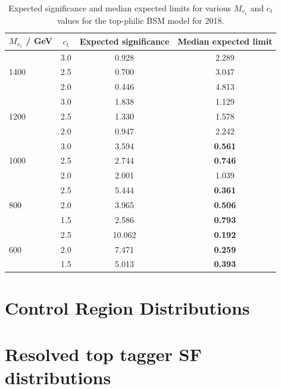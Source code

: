 \documentclass[twoside]{article}
\begin{document}
\begin{table}[h!]
    \centering
    \begin{tabular}{l c c c}
        \toprule
        \textbf{$M_{v_{1}}$ / GeV} & \textbf{$c_t$} & \textbf{Expected significance} & \textbf{Median expected limit} \\
        \midrule
        \multirow{3}{*}{1400} & 3.0 & 0.928 & 2.289 \\
                              & 2.5 & 0.700 & 3.047 \\
                              & 2.0 & 0.446 & 4.813 \\
        \midrule
        \multirow{3}{*}{1200} & 3.0 & 1.838 & 1.129 \\
                              & 2.5 & 1.330 & 1.578 \\
                              & 2.0 & 0.947 & 2.242 \\
        \midrule
        \multirow{3}{*}{1000} & 3.0 & 3.594 & \textbf{0.561} \\
                              & 2.5 & 2.744 & \textbf{0.746} \\
                              & 2.0 & 2.001 & 1.039 \\
        \midrule
        \multirow{3}{*}{800}  & 2.5 & 5.444 & \textbf{0.361} \\
                              & 2.0 & 3.965 & \textbf{0.506} \\
                              & 1.5 & 2.586 & \textbf{0.793} \\
        \midrule
        \multirow{3}{*}{600}  & 2.5 & 10.062 & \textbf{0.192} \\
                              & 2.0 & 7.471  & \textbf{0.259} \\
                              & 1.5 & 5.013  & \textbf{0.393} \\
        \bottomrule
    \end{tabular}
    \caption{Expected significance and median expected limits for various $M_{v_{1}}$ and $c_t$ values for the top-philic BSM model for 2018.}
    \label{tab:combine_res_top_philic}
\end{table}

\appendix
\section{Control Region Distributions}
\section{Resolved top tagger SF distributions}
\end{document}
